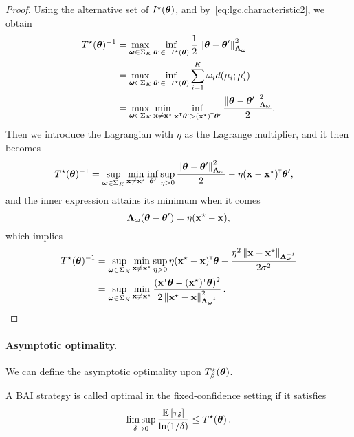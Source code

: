 \begin{proof}
Using the alternative set of $I^\star({\boldsymbol \theta})$, and by~\eqref{eq:lgc.characteristic2}, we obtain
\begin{align*}
    T^\star({\boldsymbol \theta})^{-1} &= \max_{{\boldsymbol \omega} \in \Sigma_K} \inf_{{\boldsymbol \theta}'\in \neg I^\star({\boldsymbol \theta})} \frac{1}{2}\left\lVert{\boldsymbol \theta} - {\boldsymbol \theta}'\right\rVert_{{\boldsymbol \Lambda}_{{\boldsymbol \omega}}}^2\\
    &= \max_{{\boldsymbol \omega}\in\Sigma_K}\inf_{{\boldsymbol \theta}'\in\neg I^\star({\boldsymbol \theta})}\sum_{i=1}^K \omega_i d(\mu_i;\mu_i')\\
    &= \max_{{\boldsymbol \omega}\in\Sigma_K}\min_{{\bf x}\neq{\bf x}^\star}\inf_{{\bf x}^\mathsf{\scriptscriptstyle T}{\boldsymbol \theta}'>({\bf x}^\star)^\mathsf{\scriptscriptstyle T}{\boldsymbol \theta}'} \frac{\left\lVert{\boldsymbol \theta}-{\boldsymbol \theta}'\right\rVert_{{\boldsymbol \Lambda}_{{\boldsymbol \omega}}}^2}{2}.
\end{align*}
Then we introduce the Lagrangian with $\eta$ as the Lagrange multiplier, and it then becomes
\begin{align*}
    T^\star({\boldsymbol \theta})^{-1} &= \sup_{{\boldsymbol \omega}\in\Sigma_K}\min_{{\bf x}\neq{\bf x}^\star}\inf_{{\boldsymbol \theta}'}\sup_{\eta>0} \frac{\left\lVert{\boldsymbol \theta}-{\boldsymbol \theta}'\right\rVert_{{\boldsymbol \Lambda}_{{\boldsymbol \omega}}}^2}{2} - \eta({\bf x}-{\bf x}^\star)^\mathsf{\scriptscriptstyle T}{\boldsymbol \theta}',
\end{align*}
and the inner expression attains its minimum when it comes
\[
    {\boldsymbol \Lambda}_{{\boldsymbol \omega}}({\boldsymbol \theta}-{\boldsymbol \theta}') = \eta({\bf x}^\star-{\bf x}),
\]
which implies
\begin{align*}
    T^\star({\boldsymbol \theta})^{-1} &=
    \sup_{{\boldsymbol \omega}\in\Sigma_K}\min_{{\bf x}\neq{\bf x}^\star}\sup_{\eta>0} \eta({\bf x}^\star-{\bf x})^\mathsf{\scriptscriptstyle T}{\boldsymbol \theta} - \frac{\eta^2\left\lVert{\bf x}-{\bf x}^\star\right\rVert_{{\boldsymbol \Lambda}_{{\boldsymbol \omega}}^{-1}}}{2\sigma^2}\\
    &= \sup_{{\boldsymbol \omega}\in\Sigma_K}\min_{{\bf x}\neq{\bf x}^\star}\frac{({\bf x}^\mathsf{\scriptscriptstyle T}{\boldsymbol \theta}-({\bf x}^\star)^\mathsf{\scriptscriptstyle T}{\boldsymbol \theta})^2}{2\left\lVert{\bf x}^\star - {\bf x}\right\rVert^2_{{\boldsymbol \Lambda}_{{\boldsymbol \omega}}^{-1}}}\,.
\end{align*}
\end{proof}

\paragraph{Asymptotic optimality.}
We can define the asymptotic optimality upon $T^\star_\beta({\boldsymbol \theta})$. 

\begin{definition}\label{def:lgc.optimality}
\begin{leftbar}[defnbar]
A BAI strategy is called optimal in the fixed-confidence setting if it satisfies
\[
    \limsup_{\delta \rightarrow 0}\frac{\mathbb{E}\left[\tau_\delta\right]}{\ln(1/\delta)} \leq T^\star({\boldsymbol \theta})\,.
\]
\end{leftbar}
\end{definition}

